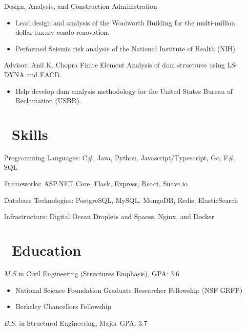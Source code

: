 \documentclass{resume}
\begin{document}
Design, Analysis, and Construction Administration
\begin{itemize}
  \item Lead design and analysis of the Woolworth Building for the
          multi-million dollar luxury condo renovation. 
  \item Performed Seismic risk analysis of the National Institute of Health (NIH)
\end{itemize}

 {Advisor: Anil K. Chopra}
Finite Element Analysis of dam structures using LS-DYNA and EACD.
\begin{itemize}
  \item Help develop dam analysis methodology for the United States Bureau of
          Reclamation (USBR).
\end{itemize}


\section{\faCogs\ Skills}

  Programming Languages: C\#, Java, Python, Javascript/Typescript, Go, F\#, SQL

  Frameworks: ASP.NET Core, Flask, Express, React, Suave.io
 
  Database Technologies: PostgreSQL, MySQL, MongoDB, Redis, ElasticSearch
 
  Infrastructure: Digital Ocean Droplets and Spaces, Nginx, and Docker


\section{\faGraduationCap\ Education}
\textit{M.S } in Civil Engineering (Structures Emphasis), GPA: 3.6

\begin{itemize}
 \item National Science Foundation Graduate Researcher Fellowship (NSF GRFP)
 \item Berkeley Chancellors Fellowship
\end{itemize}

\textit{B.S.} in Structural Engineering, Major GPA: 3.7

%
%
\end{document}
